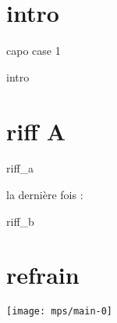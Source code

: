 \documentclass[11pt]{article}
\begin{document}
    \makesongtitle
    \section*{intro}

    \textrightarrow capo case 1

    {intro}


    \section{riff A}
    {riff_a}

    la derni\`ere fois :

    {riff_b}


    \section{refrain}
    \texttt{[image: mps/main-0]}


    \newpage
    




%    


%    
\end{document}
